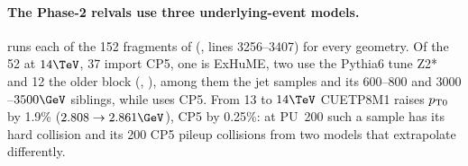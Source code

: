 \paragraph{The Phase-2 relvals use three underlying-event models.}
 runs each of the 152 fragments of  (,
lines 3256--3407) for every  geometry. Of the 52 at $14\TeV$, 37 import CP5, one is ExHuME, two use the
Pythia6 tune Z2* and 12 the older block  (,
), among them the jet samples  and
its $600$--$800$ and $3000$--$3500\GeV$ siblings, while  uses CP5. From 13 to
$14\TeV$ CUETP8M1 raises $p_{\mathrm{T}0}$ by 1.9\% ($2.808\to2.861\GeV$), CP5 by 0.25\%: at PU~200 such a sample has its
hard collision and its 200 CP5 pileup collisions from two models that extrapolate differently.
